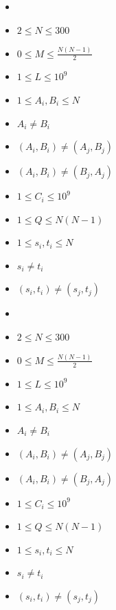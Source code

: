 \documentclass{whiteboard}
\begin{document}
\begin{frame}[plain,t]
\vspace*{\fill}

 \vspace{0.1in}

 \begin{footnotesize}
 \begin{itemize}
 \item {}
 \item $2\leq N\leq 300$
 \item $0\leq M \leq \frac{N(N - 1)}{2}$
 \item $1\leq L\leq 10^9$
 \item $1\leq A_i, B_i\leq N$
 \item $A_i\neq B_i$
 \item $(A_i, B_i)\neq (A_j, B_j)$ 
 \item $(A_i, B_i)\neq (B_j, A_j)$ 
 \item $1\leq C_i\leq 10^9$
 \item $1\leq Q\leq N(N - 1)$
 \item $1\leq s_i, t_i\leq N$
 \item $s_i\neq t_i$
 \item $(s_i, t_i)\neq (s_j, t_j)$ 
 \end{itemize}
 \end{footnotesize}
\vspace*{\fill}
\end{frame}

\begin{frame}[plain,t]
\vspace*{\fill}

 \vspace{0.1in}

 \begin{footnotesize}
 \begin{itemize}
 \item {}
 \item $2\leq N\leq 300$
 \item $0\leq M \leq \frac{N(N - 1)}{2}$
 \item $1\leq L\leq 10^9$
 \item $1\leq A_i, B_i\leq N$
 \item $A_i\neq B_i$
 \item $(A_i, B_i)\neq (A_j, B_j)$ 
 \item $(A_i, B_i)\neq (B_j, A_j)$ 
 \item $1\leq C_i\leq 10^9$
 \item $1\leq Q\leq N(N - 1)$
 \item $1\leq s_i, t_i\leq N$
 \item $s_i\neq t_i$
 \item $(s_i, t_i)\neq (s_j, t_j)$ 
 \end{itemize}
 \end{footnotesize}
\vspace*{\fill}
\end{frame}
\end{document}
